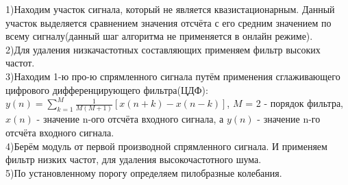 \documentclass[a4]{article}
\begin{document}
		1)Находим участок сигнала, который не является квазистационарным. Данный участок выделяется сравнением значения отсчёта с его средним значением по всему сигналу(данный шаг алгоритма не применяется в онлайн режиме).\\
		
		2)Для удаления низкачастотных составляющих применяем фильтр высоких частот.\\
		
		3)Находим 1-ю про-ю спрямленного сигнала путём применения сглаживающего цифрового дифференцирующего фильтра(ЦДФ):\\
		$y(n) = \sum_{k=1}^{M} \frac{1}{M(M+1)} [x(n+k) - x(n - k)]$, $M$ = 2 - порядок фильтра, $x(n)$ - значение n-ого отсчёта входного сигнала, а $y(n)$ - значение n-го отсчёта входного сигнала.\\
		
		4)Берём модуль от первой производной спрямленного сигнала. И применяем фильтр низких частот, для удаления высокочастотного шума.\\
		
		5)По установленному порогу определяем пилобразные колебания.\\
	
	\newpage
\end{document}
